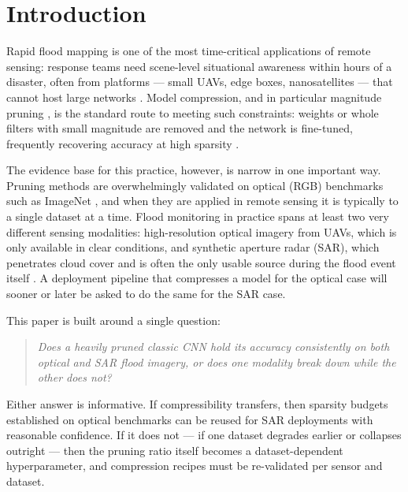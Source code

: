 \documentclass[conference]{IEEEtran}
\newif\ifreview
\newcommand{\REV}[1]{\ifreview\textcolor{red}{\textbf{[Revise: #1]}}\fi}
\begin{document}
\section{Introduction}
Rapid flood mapping is one of the most time-critical applications of
remote sensing: response teams need scene-level situational awareness
within hours of a disaster, often from platforms --- small UAVs, edge
boxes, nanosatellites --- that cannot host large networks
\cite{rahnemoonfar2021floodnet,khan2023floodresnet50}. Model
compression, and in particular magnitude pruning
\cite{han2015learning,li2017pruning}, is the standard route to meeting
such constraints: weights or whole filters with small magnitude are
removed and the network is fine-tuned, frequently recovering accuracy
at high sparsity \cite{blalock2020state}.
\REV{[A8] Add 1--2 more citations for pruning surveys/filter pruning
(see suggested bib items at the end: Hoefler et al.\ 2021, He et al.\
2017, Molchanov et al.\ 2017). Also cite 1--2 papers on CNN compression
for remote sensing/SAR (search: ``pruning remote sensing scene
classification'', ``SAR ATR model compression'', ``lightweight CNN
SAR''); and add our own prior work on lightweight remote-sensing scene
classification if published.}

The evidence base for this practice, however, is narrow in one
important way. Pruning methods are overwhelmingly validated on optical
(RGB) benchmarks such as ImageNet \cite{deng2009imagenet}, and when
they are applied in remote sensing it is typically to a single dataset
at a time. Flood monitoring in practice spans at least two very
different sensing modalities: high-resolution optical imagery from
UAVs, which is only available in clear conditions, and synthetic
aperture radar (SAR), which penetrates cloud cover and is often the
only usable source during the flood event itself
\cite{bonafilia2020sen1floods11}. A deployment pipeline that
compresses a model for the optical case will sooner or later be asked
to do the same for the SAR case.

This paper is built around a single question:
\begin{quote}
\emph{Does a heavily pruned classic CNN hold its accuracy consistently
on both optical and SAR flood imagery, or does one modality break down
while the other does not?}
\end{quote}
Either answer is informative. If compressibility transfers, then
sparsity budgets established on optical benchmarks can be reused for
SAR deployments with reasonable confidence. If it does not --- if one
dataset degrades earlier or collapses outright --- then the pruning
ratio itself becomes a dataset-dependent hyperparameter, and
compression recipes must be re-validated per sensor and dataset.
\end{document}
